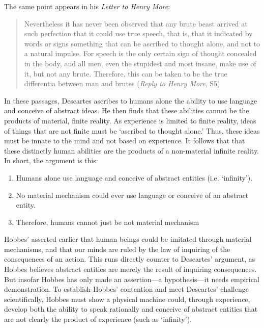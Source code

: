 The same point appears in his \emph{Letter to Henry More}:

\begin{quote}

Nevertheless it has never been observed that any brute beast arrived at such perfection that it could use true speech, that is, that it indicated by words or signs something that can be ascribed to thought alone, and not to a natural impulse. For speech is the only certain sign of thought concealed in the body, and all men, even the stupidest and most insane, make use of it, but not any brute. Therefore, this can be taken to be the true differentia between man and brutes (\emph{Reply to Henry More}, S5)
\end{quote}

In these passages, Descartes ascribes to humans alone the ability to use language and conceive of abstract ideas. He then finds that these abilities cannot be the products of material, finite reality. As experience is limited to finite reality, ideas of things that are not finite must be `ascribed to thought alone.' Thus, these ideas must be innate to the mind and not based on experience. It follows that that these distinctly human abilities are the products of a non-material infinite reality. In short, the argument is this:

\begin{enumerate}
\item Humans alone use language and conceive of abstract entities (i.e. `infinity').

\item No material mechanism could ever use language or conceive of an abstract entity.

\item Therefore, humans cannot just be not material mechanism

\end{enumerate}

Hobbes' asserted earlier that human beings could be imitated through material mechanisms, and that our minds are ruled by the law of inquiring of the consequences of an action. This runs directly counter to Descartes' argument, as Hobbes believes abstract entities are merely the result of inquiring consequences. But insofar Hobbes has only made an assertion---a hypothesis---it needs empirical demonstration. To establish Hobbes' contention and meet Descartes' challenge scientifically, Hobbes must show a physical machine could, through experience, develop both the ability to speak rationally and conceive of abstract entities that are not clearly the product of experience (such as `infinity').

